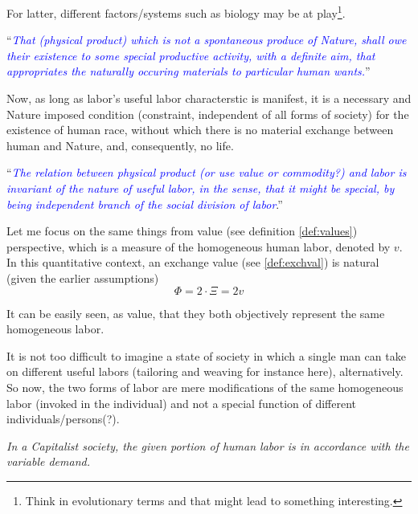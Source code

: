 \documentclass[12pt]{extarticle}
\theoremstyle{definition}
\begin{document}
For latter, different factors/systems such as biology may be at play\footnote{Think in evolutionary terms and that might lead to something interesting.}.

``\emph{\textcolor{blue}{That (physical product) which is not a spontaneous produce of Nature, shall owe their existence to some special productive activity, with a definite aim, that appropriates the naturally occuring materials to particular human wants.}}''

Now, as long as labor's useful labor characterstic is manifest, it is a necessary and Nature imposed condition (constraint, independent of all forms of society) for the existence of human race, without which there is no material exchange between human and Nature, and, consequently, no life.

``\emph{\textcolor{blue}{The relation between physical product (or use value or commodity?) and labor is invariant of the nature of useful labor, in the sense, that it might be special, by being independent branch of the social division of labor}}.''

Let me focus on the same things from value (see definition \ref{def:values}) perspective, which is a measure of the homogeneous human labor, denoted by $v$.  In this quantitative context, an exchange value (see \ref{def:exchval}) is natural (given the earlier assumptions)
\begin{equation}
  \label{eq:exchange}
  \Phi = 2\cdot\Xi = 2v
\end{equation}

It can be easily seen, as value, that they both objectively represent the same homogeneous labor.

It is not too difficult to imagine a state of society in which a single man can take on different useful labors (tailoring and weaving for instance here), alternatively.  So now, the two forms of labor are mere modifications of the same homogeneous labor (invoked in the individual) and not a special function of different individuals/persons(?).

\emph{In a Capitalist society, the given portion of human labor is in accordance with the variable demand.}



\end{document}
